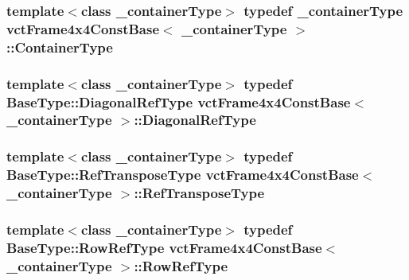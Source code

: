 \subsubsection[{Container\+Type}]{\setlength{\rightskip}{0pt plus 5cm}template$<$class \+\_\+container\+Type$>$ typedef \+\_\+container\+Type {\bf vct\+Frame4x4\+Const\+Base}$<$ \+\_\+container\+Type $>$\+::{\bf Container\+Type}}\label{classvct_frame4x4_const_base_ac8b3e3540ee9e065a519d7b364276662}
\hypertarget{classvct_frame4x4_const_base_a6712c128a1d2b45ab9c713befeddf2c6}{}
\subsubsection[{Diagonal\+Ref\+Type}]{\setlength{\rightskip}{0pt plus 5cm}template$<$class \+\_\+container\+Type$>$ typedef Base\+Type\+::\+Diagonal\+Ref\+Type {\bf vct\+Frame4x4\+Const\+Base}$<$ \+\_\+container\+Type $>$\+::{\bf Diagonal\+Ref\+Type}}\label{classvct_frame4x4_const_base_a6712c128a1d2b45ab9c713befeddf2c6}
\hypertarget{classvct_frame4x4_const_base_a1cedffcdbf60e8ec01a0a61d6ceb24b7}{}
\subsubsection[{Ref\+Transpose\+Type}]{\setlength{\rightskip}{0pt plus 5cm}template$<$class \+\_\+container\+Type$>$ typedef Base\+Type\+::\+Ref\+Transpose\+Type {\bf vct\+Frame4x4\+Const\+Base}$<$ \+\_\+container\+Type $>$\+::{\bf Ref\+Transpose\+Type}}\label{classvct_frame4x4_const_base_a1cedffcdbf60e8ec01a0a61d6ceb24b7}
\hypertarget{classvct_frame4x4_const_base_a4032e45bc1de2cf3ef9436aef57f1595}{}
\subsubsection[{Row\+Ref\+Type}]{\setlength{\rightskip}{0pt plus 5cm}template$<$class \+\_\+container\+Type$>$ typedef Base\+Type\+::\+Row\+Ref\+Type {\bf vct\+Frame4x4\+Const\+Base}$<$ \+\_\+container\+Type $>$\+::{\bf Row\+Ref\+Type}}\label{classvct_frame4x4_const_base_a4032e45bc1de2cf3ef9436aef57f1595}
\hypertarget{classvct_frame4x4_const_base_aa63c7449b3c8248ec0d2e852d2389ae9}{}
